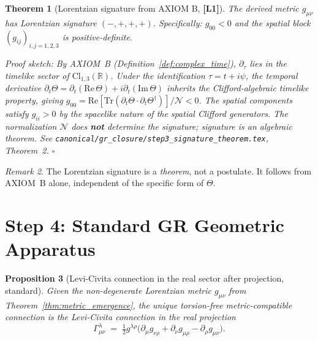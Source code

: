 \documentclass[12pt,a4paper]{article}
\newtheorem{theorem}{Theorem}[section]
\newtheorem{proposition}[theorem]{Proposition}
\theoremstyle{definition}
\theoremstyle{remark}
\newtheorem{remark}[theorem]{Remark}
\newcommand{\Lone}{\textbf{[L1]}}
\begin{document}
\begin{theorem}[Lorentzian signature from AXIOM B, \Lone]
\label{thm:signature}
The derived metric $g_{\mu\nu}$ has Lorentzian signature $(-,+,+,+)$.
Specifically: $g_{00} < 0$ and the spatial block $(g_{ij})_{i,j=1,2,3}$
is positive-definite.

\medskip
\emph{Proof sketch}: By AXIOM~B (Definition~\ref{def:complex_time}),
$\partial_\tau$ lies in the timelike sector of $\mathrm{Cl}_{1,3}(\mathbb{R})$.
Under the identification $\tau = t + i\psi$, the temporal derivative
$\partial_t\Theta = \partial_t(\mathrm{Re}\,\Theta) + i\partial_t(\mathrm{Im}\,\Theta)$
inherits the Clifford-algebraic timelike property, giving
$g_{00} = \mathrm{Re}[\mathrm{Tr}(\partial_t\Theta\cdot\partial_t\Theta^\dagger)]/\mathcal{N} < 0$.
The spatial components satisfy $g_{ii} > 0$ by the spacelike nature of the
spatial Clifford generators.
The normalization $\mathcal{N}$ does \textbf{not} determine the signature;
signature is an algebraic theorem.
See \texttt{canonical/gr\_closure/step3\_signature\_theorem.tex}, Theorem~2.
\hfill$\square$
\end{theorem}

\begin{remark}
The Lorentzian signature is a \emph{theorem}, not a postulate.  It follows
from AXIOM~B alone, independent of the specific form of $\Theta$.
\end{remark}

\section{Step 4: Standard GR Geometric Apparatus}
\label{sec:step4}

\begin{proposition}[Levi-Civita connection in the real sector after projection, standard]
\label{prop:levi_civita}
Given the non-degenerate Lorentzian metric $g_{\mu\nu}$ from Theorem~\ref{thm:metric_emergence},
the unique torsion-free metric-compatible connection is the Levi-Civita connection in the real projection
\[
  \Gamma^\lambda_{\mu\nu} \;=\; \tfrac{1}{2}g^{\lambda\rho}
  \bigl(\partial_\mu g_{\nu\rho} + \partial_\nu g_{\mu\rho} - \partial_\rho g_{\mu\nu}\bigr).
\]
\end{proposition}
\end{document}
